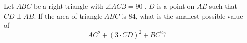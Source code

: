 Let $ABC$ be a right triangle with $\angle{ACB}=90^{\circ}$. $D$ is a point on $AB$ such that $CD\perp AB$. If the area of triangle $ABC$ is $84$, what is the smallest possible value of $$AC^2+\left(3\cdot CD\right)^2+BC^2?$$